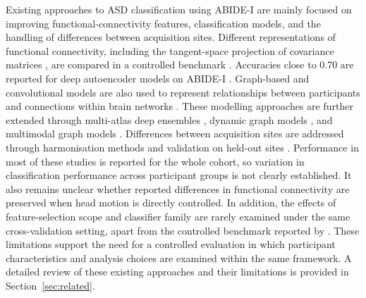 Existing approaches to ASD classification using ABIDE-I are mainly focused on improving functional-connectivity features, classification models, and the handling of differences between acquisition sites. Different representations of functional connectivity, including the tangent-space projection of covariance matrices \citep{Varoquauxetal2010}, are compared in a controlled benchmark \citep{Dadietal2019}. Accuracies close to 0.70 are reported for deep autoencoder models on ABIDE-I \citep{Heinsfeldetal2018,Eslamietal2019,AlmuqhimSaeed2021}. Graph-based and convolutional models are also used to represent relationships between participants \citep{Parisotetal2018} and connections within brain networks \citep{Kawaharaetal2017}. These modelling approaches are further extended through multi-atlas deep ensembles \citep{Liuetal2024MADE}, dynamic graph models \citep{Tangetal2025GNNLSTM}, and multimodal graph models \citep{Tangetal2026CASGNN}. Differences between acquisition sites are addressed through harmonisation methods \citep{Johnsonetal2007,Fortinetal2018} and validation on held-out sites \citep{Abrahametal2017}. Performance in most of these studies is reported for the whole cohort, so variation in classification performance across participant groups is not clearly established. It also remains unclear whether reported differences in functional connectivity are preserved when head motion is directly controlled. In addition, the effects of feature-selection scope and classifier family are rarely examined under the same cross-validation setting, apart from the controlled benchmark reported by \citet{Dadietal2019}. These limitations support the need for a controlled evaluation in which participant characteristics and analysis choices are examined within the same framework. A detailed review of these existing approaches and their limitations is provided in Section~\ref{sec:related}.


